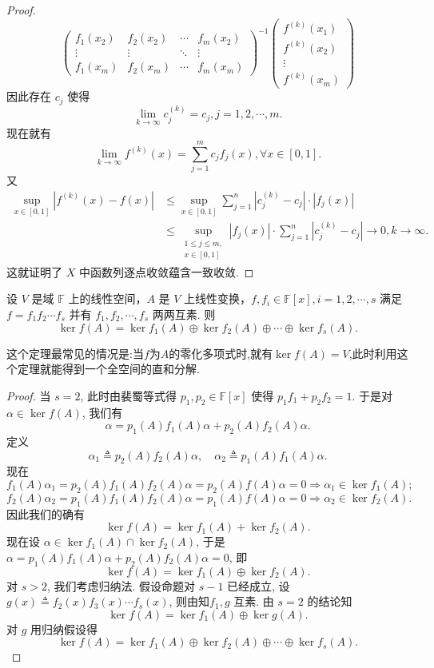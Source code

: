 \documentclass[../../main.tex]{subfiles}
\begin{document}
\begin{proof}
\[\begin{pmatrix}
f_1(x_2) & f_2(x_2) & \cdots & f_m(x_2) \\
\vdots & \vdots & \ddots & \vdots \\
f_1(x_m) & f_2(x_m) & \cdots & f_m(x_m)
\end{pmatrix}^{-1}
\begin{pmatrix}
f^{(k)}(x_1) \\
f^{(k)}(x_2) \\
\vdots \\
f^{(k)}(x_m)
\end{pmatrix}
\]
因此存在 \( c_j \) 使得
\[
\lim_{k \to \infty} c_j^{(k)} = c_j, j = 1, 2, \cdots, m.
\]
现在就有
\[
\lim_{k \to \infty} f^{(k)}(x) = \sum_{j=1}^m c_j f_j(x), \forall x \in [0,1].
\]
又
\[
\begin{aligned}
\sup_{x \in [0,1]} \left| f^{(k)}(x) - f(x) \right| &\leqslant \sup_{x \in [0,1]} \sum_{j=1}^n \left| c_j^{(k)} - c_j \right| \cdot \left| f_j(x) \right| \\
&\leqslant \sup_{\substack{1 \leqslant j \leqslant m, \\ x \in [0,1]}} \left| f_j(x) \right| \cdot \sum_{j=1}^n \left| c_j^{(k)} - c_j \right| \to 0, k \to \infty.
\end{aligned}
\]
这就证明了 \( X \) 中函数列逐点收敛蕴含一致收敛.
\end{proof}

\begin{theorem}\label{theorem:线性变换互素分解对应核子空间直和分解}
设 $V$ 是域 $\mathbb{F}$ 上的线性空间，$A$ 是 $V$ 上线性变换，$f, f_i \in \mathbb{F}[x], i = 1,2,\cdots, s$ 满足 $f = f_1f_2\cdots f_s$ 并有 $f_1, f_2, \cdots, f_s$ 两两互素. 则
$$\ker f(A) = \ker f_1(A) \oplus \ker f_2(A) \oplus \cdots \oplus \ker f_s(A).$$
\end{theorem}
\begin{note}
这个定理最常见的情况是:当$f$为$A$的零化多项式时,就有$\ker f(A)=V$,此时利用这个定理就能得到一个全空间的直和分解.
\end{note}
\begin{proof}
当 $s = 2$, 此时由裴蜀等式得 $p_1, p_2 \in \mathbb{F}[x]$ 使得 $p_1f_1 + p_2f_2 = 1$. 于是对 $\alpha \in \ker f(A)$, 我们有
$$\alpha = p_1(A)f_1(A)\alpha + p_2(A)f_2(A)\alpha.$$
定义
$$\alpha_1 \triangleq p_2(A)f_2(A)\alpha,\quad \alpha_2 \triangleq p_1(A)f_1(A)\alpha.$$
现在
$$f_1(A)\alpha_1 = p_2(A)f_1(A)f_2(A)\alpha = p_2(A)f(A)\alpha = 0 \Rightarrow \alpha_1 \in \ker f_1(A);$$
$$f_2(A)\alpha_2 = p_1(A)f_1(A)f_2(A)\alpha = p_1(A)f(A)\alpha = 0 \Rightarrow \alpha_2 \in \ker f_2(A).$$
因此我们的确有
$$\ker f(A) = \ker f_1(A) + \ker f_2(A).$$
现在设 $\alpha \in \ker f_1(A) \cap \ker f_2(A)$, 于是 $\alpha = p_1(A)f_1(A)\alpha + p_2(A)f_2(A)\alpha = 0$, 即
$$\ker f(A) = \ker f_1(A) \oplus \ker f_2(A).$$
对 $s > 2$, 我们考虑归纳法. 假设命题对 $s - 1$ 已经成立, 设 $g(x) \triangleq f_2(x)f_3(x)\cdots f_s(x)$, 则由知$f_1, g$ 互素. 由 $s = 2$ 的结论知
$$\ker f(A) = \ker f_1(A) \oplus \ker g(A).$$
对 $g$ 用归纳假设得
$$\ker f(A) = \ker f_1(A) \oplus \ker f_2(A) \oplus \cdots \oplus \ker f_s(A).$$
\end{proof}
\end{document}
